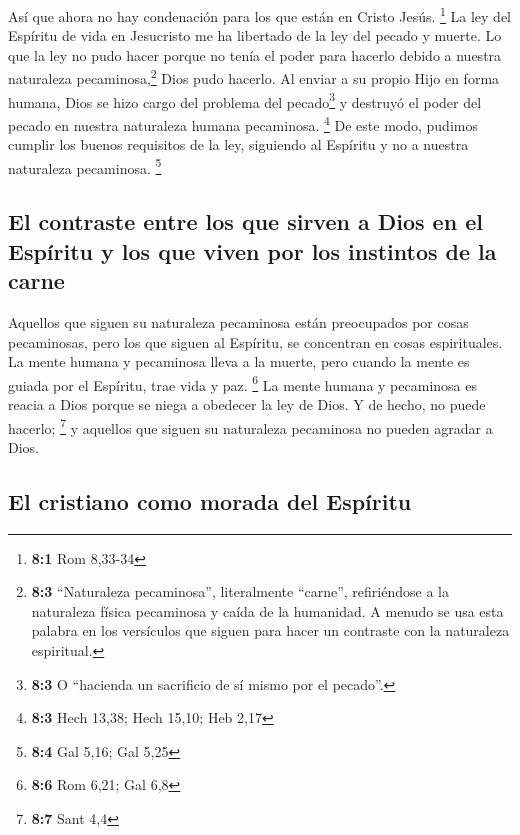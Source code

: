  Así que ahora no hay condenación para los que están en
Cristo Jesús. \footnote{\textbf{8:1} Rom 8,33-34}  La ley
del Espíritu de vida en Jesucristo me ha libertado de la ley del pecado
y muerte.  Lo que la ley no pudo hacer porque no tenía el
poder para hacerlo debido a nuestra naturaleza pecaminosa,\footnote{\textbf{8:3}
  ``Naturaleza pecaminosa'', literalmente ``carne'', refiriéndose a la
  naturaleza física pecaminosa y caída de la humanidad. A menudo se usa
  esta palabra en los versículos que siguen para hacer un contraste con
  la naturaleza espiritual.} Dios pudo hacerlo. Al enviar a su propio
Hijo en forma humana, Dios se hizo cargo del problema del
pecado\footnote{\textbf{8:3} O ``hacienda un sacrificio de sí mismo por
  el pecado''.} y destruyó el poder del pecado en nuestra naturaleza
humana pecaminosa. \footnote{\textbf{8:3} Hech 13,38; Hech 15,10; Heb
  2,17}  De este modo, pudimos cumplir los buenos
requisitos de la ley, siguiendo al Espíritu y no a nuestra naturaleza
pecaminosa. \footnote{\textbf{8:4} Gal 5,16; Gal 5,25}

\hypertarget{el-contraste-entre-los-que-sirven-a-dios-en-el-espuxedritu-y-los-que-viven-por-los-instintos-de-la-carne}{%
\subsection{El contraste entre los que sirven a Dios en el Espíritu y
los que viven por los instintos de la
carne}\label{el-contraste-entre-los-que-sirven-a-dios-en-el-espuxedritu-y-los-que-viven-por-los-instintos-de-la-carne}}

 Aquellos que siguen su naturaleza pecaminosa están
preocupados por cosas pecaminosas, pero los que siguen al Espíritu, se
concentran en cosas espirituales.  La mente humana y
pecaminosa lleva a la muerte, pero cuando la mente es guiada por el
Espíritu, trae vida y paz. \footnote{\textbf{8:6} Rom 6,21; Gal 6,8}
 La mente humana y pecaminosa es reacia a Dios porque se
niega a obedecer la ley de Dios. Y de hecho, no puede hacerlo;
\footnote{\textbf{8:7} Sant 4,4}  y aquellos que siguen su
naturaleza pecaminosa no pueden agradar a Dios.

\hypertarget{el-cristiano-como-morada-del-espuxedritu}{%
\subsection{El cristiano como morada del
Espíritu}\label{el-cristiano-como-morada-del-espuxedritu}}

